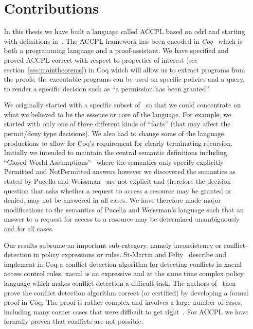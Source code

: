 \documentclass[runningheads,a4paper]{llncs}
\begin{document}
\section{Contributions}\label{sec:contribs}

In this thesis we have built a language called \ac{ACCPL} based on \ac{odrl} and starting with definitions in~\cite{pucella2006}. The \ac{ACCPL} framework has been encoded in \emph{Coq}~\cite{BC04} which is both a programming language and a proof-assistant. We have specified and proved \ac{ACCPL} correct with respect to properties of interest (see section~\ref{sec:maintheorems}) in Coq which will allow us to extract programs from the proofs; the executable programs can be used on specific policies and a query, to render a specific decision such as ``a permission has been granted''. 

We originally started with a specific subset of~\cite{pucella2006} so that we could concentrate on what we believed to be the essence or core of the language. For example, we started with only one of three different kinds of ``facts'' (that may affect the permit/deny type decisions). We also had to change some of the language productions to allow for Coq's requirement for clearly terminating recursion. Initially we intended to maintain the central semantic definitions including ``Closed World Assumptions''~\cite{pucella2006} where the semantics only specify explicitly Permitted and NotPermitted answers however we discovered the semantics as stated by Pucella and Weissman~\cite{pucella2006} are not explicit and therefore the decision question that asks whether a request to access a resource may be granted or denied, may not be answered in all cases. We have therefore made major modifications to the semantics of Pucella and Weissman's language such that an answer to a request for access to a resource may be determined unambiguously and for all cases. 
    
Our results subsume an important sub-category, namely inconsistency or conflict-detection in policy expressions or rules. St-Martin and Felty~\cite{felty16} describe and implement in Coq a conflict detection algorithm for detecting conflicts in \ac{xacml} access control rules. \ac{xacml} is an expressive and at the same time complex policy language which makes conflict detection a difficult task. The authors of~\cite{felty16} then prove the conflict detection algorithm correct (or certified) by developing a formal proof in Coq. The proof is rather complex and involves a large number of cases, including many corner cases that were difficult to get right~\cite{felty16}. For \ac{ACCPL} we have formally proven that conflicts are not possible.
\end{document}
